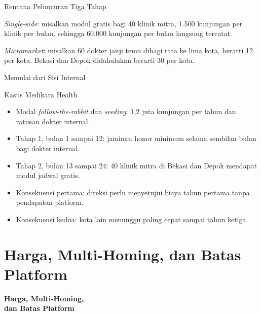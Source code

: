 \documentclass[aspectratio=169, table, 12pt]{beamer}
\begin{document}
\begin{frame}{{\Large Rencana Peluncuran Tiga Tahap}}
  \centering
  \resizebox{0.88\textwidth}{!}{}

  \vspace{4pt}
  \raggedright
  {\footnotesize \textit{Single-side}: misalkan modul gratis bagi 40 klinik mitra, 1.500 kunjungan per klinik per bulan, sehingga 60.000 kunjungan per bulan langsung tercatat.\par
  \textit{Micromarket}: misalkan 60 dokter janji temu dibagi rata ke lima kota, berarti 12 per kota. Bekasi dan Depok didahulukan berarti 30 per kota.\par}
\end{frame}

\begin{frame}{{\Large Memulai dari Sisi Internal}}
  \begin{block}{Kasus Medikara Health}
    \small
    \begin{itemize}
      \item Modal \textit{follow-the-rabbit} dan \textit{seeding}: 1,2 juta kunjungan per tahun dan ratusan dokter internal.
      \item Tahap 1, bulan 1 sampai 12: jaminan honor minimum selama sembilan bulan bagi dokter internal.
      \item Tahap 2, bulan 13 sampai 24: 40 klinik mitra di Bekasi dan Depok mendapat modul jadwal gratis.
      \item Konsekuensi pertama: direksi perlu menyetujui biaya tahun pertama tanpa pendapatan platform.
      \item Konsekuensi kedua: kota lain menunggu paling cepat sampai tahun ketiga.
    \end{itemize}
  \end{block}
\end{frame}

\section{Harga, Multi-Homing, dan Batas Platform}

\begin{frame}{\hfill}
  \centering
  \Huge{\textbf{Harga, Multi-Homing,\\dan Batas Platform}}
\end{frame}
\end{document}
